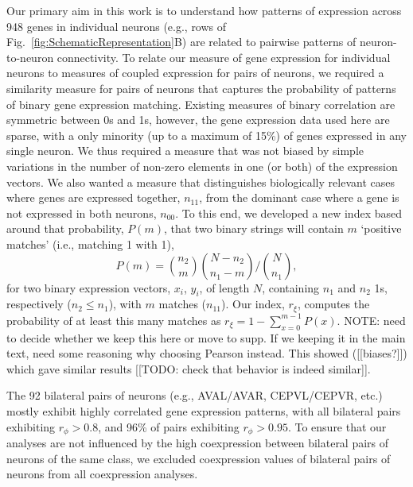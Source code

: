 \documentclass[10pt,letterpaper]{article}
\begin{document}
Our primary aim in this work is to understand how patterns of expression across 948 genes in individual neurons (e.g., rows of Fig.~\ref{fig:SchematicRepresentation}B) are related to pairwise patterns of neuron-to-neuron connectivity.
To relate our measure of gene expression for individual neurons to measures of coupled expression for pairs of neurons, we required a similarity measure for pairs of neurons that captures the probability of patterns of binary gene expression matching.
Existing measures of binary correlation are symmetric between 0s and 1s, however, the gene expression data used here are sparse, with a only minority (up to a maximum of 15\%) of genes expressed in any single neuron.
We thus required a measure that was not biased by simple variations in the number of non-zero elements in one (or both) of the expression vectors.
We also wanted a measure that distinguishes biologically relevant cases where genes are expressed together, $n_{11}$, from the dominant case where a gene is not expressed in both neurons, $n_{00}$.
To this end, we developed a new index based around that probability, $P(m)$, that two binary strings will contain $m$ `positive matches' (i.e., matching 1 with 1),
\begin{equation} \label{eqn:positiveMatch}
    P(m) = \binom{n_2}{m} \binom{N-n_2}{n_1-m} / \binom{N}{n_1},
\end{equation}
for two binary expression vectors, $x_i$, $y_i$, of length $N$, containing $n_1$ and $n_2$ 1s, respectively ($n_2 \leq n_1$), with $m$ matches ($n_{11}$).
Our index, $r_\xi$, computes the probability of at least this many matches as $r_\xi = 1 - \sum_{x=0}^{m-1} P(x)$.
NOTE: need to decide whether we keep this here or move to supp. If we keeping it in the main text, need some reasoning why choosing Pearson instead.
This showed ([[biases?]]) which gave similar results [[TODO: check that behavior is indeed similar]].


The 92 bilateral pairs of neurons (e.g., AVAL/AVAR, CEPVL/CEPVR, etc.) mostly exhibit highly correlated gene expression patterns, with all bilateral pairs exhibiting $r_\phi > 0.8$, and 96\% of pairs exhibiting $r_\phi > 0.95$.
To ensure that our analyses are not influenced by the high coexpression between bilateral pairs of neurons of the same class, we excluded coexpression values of bilateral pairs of neurons from all coexpression analyses.
\end{document}
